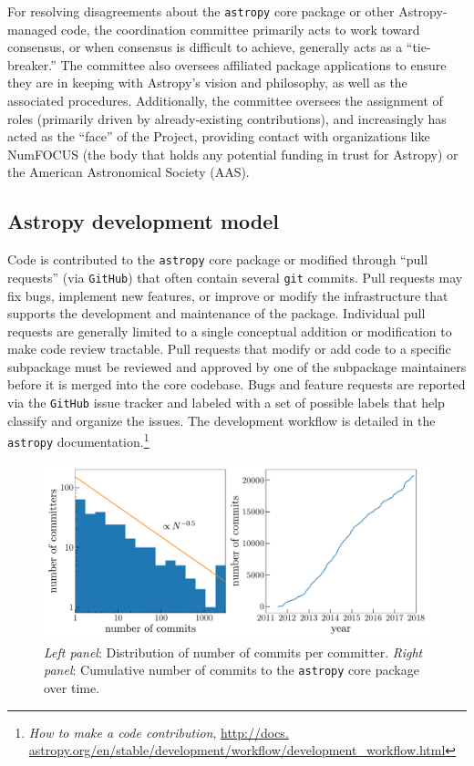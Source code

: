 \documentclass[modern]{aastex61}
\newcommand{\package}[1]{\texttt{#1}\xspace}
\newcommand{\github}{\package{GitHub}}
\newcommand{\astropy}{Astropy\xspace}
\newcommand{\astropypkg}{\package{astropy}}
\begin{document}
For resolving disagreements about the \astropypkg core package or other \astropy-managed code, the coordination committee primarily acts to work toward consensus, or when consensus is difficult to achieve, generally acts as a ``tie-breaker.''
The committee also oversees affiliated package applications to ensure they are in keeping with \astropy's vision and philosophy, as well as the associated procedures.
Additionally, the committee oversees the assignment of roles (primarily driven by already-existing contributions), and increasingly has acted as the ``face'' of the Project, providing contact with organizations like NumFOCUS (the body that holds any potential funding in trust for \astropy) or the American Astronomical Society (AAS).

\subsection{Astropy development model}
Code is contributed to the \astropypkg core package or modified through ``pull
requests'' (via \github) that often contain several \texttt{git} commits.
Pull requests may fix bugs, implement new features, or improve or modify the
infrastructure that supports the development and maintenance of the package.
Individual pull requests are generally limited to a single conceptual addition
or modification to make code review tractable.
Pull requests that modify or add code to a specific subpackage must be reviewed
and approved by one of the subpackage maintainers before it is merged into the
core codebase.
Bugs and feature requests are reported via the \github issue tracker and labeled
with a set of possible labels that help classify and organize the issues.
The development workflow is detailed in the \astropypkg
documentation.\footnote{\emph{How to make a code contribution}, \url{http://docs.
astropy.org/en/stable/development/workflow/development_workflow.html}}

\begin{figure}
\includegraphics[width=\textwidth]{ncommits.pdf}
\caption{%
    \emph{Left panel}: Distribution of number of commits per committer.
    \emph{Right panel}: Cumulative number of commits to the \astropypkg core
    package over time.
    \label{fig:ncommits}
}
\end{figure}
\end{document}
